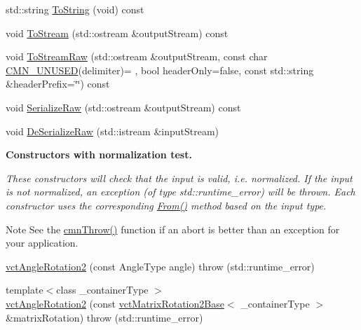 \begin{DoxyCompactItemize}
std\+::string \hyperlink{classvct_angle_rotation2_a8b9dfa85894a2db5a16bca82e84722b3}{To\+String} (void) const 
\item 
void \hyperlink{classvct_angle_rotation2_a413c2f8d65112ff7e8382c605c20a37a}{To\+Stream} (std\+::ostream \&output\+Stream) const 
\item 
void \hyperlink{classvct_angle_rotation2_a4990b0ad346f5186f7ba4bb5342ab9f1}{To\+Stream\+Raw} (std\+::ostream \&output\+Stream, const char \hyperlink{cmn_portability_8h_a021894e2626935fa2305434b1e893ff6}{C\+M\+N\+\_\+\+U\+N\+U\+S\+E\+D}(delimiter)= \textquotesingle{} \textquotesingle{}, bool header\+Only=false, const std\+::string \&header\+Prefix=\char`\"{}\char`\"{}) const 
\item 
void \hyperlink{classvct_angle_rotation2_ad097953f97ed6c015bcc97c7aff99d11}{Serialize\+Raw} (std\+::ostream \&output\+Stream) const 
\item 
void \hyperlink{classvct_angle_rotation2_acf9bfa185dd8d9dd5d68899b904226fa}{De\+Serialize\+Raw} (std\+::istream \&input\+Stream)
\end{DoxyCompactItemize}
\begin{Indent}{\bf Constructors with normalization test.}\par
{\em These constructors will check that the input is valid, i.\+e. normalized. If the input is not normalized, an exception (of type {\ttfamily std\+::runtime\+\_\+error}) will be thrown. Each constructor uses the corresponding \hyperlink{classvct_angle_rotation2_a831a44a42d74add50de6b0cf38c13087}{From()} method based on the input type.

\begin{DoxyNote}{Note}
See the \hyperlink{_minimal_cmn_8h_ad50e82cf9c9dbd0e6443c13e0d1a6f1a}{cmn\+Throw()} function if an {\ttfamily abort} is better than an exception for your application. 
\end{DoxyNote}
}\begin{DoxyCompactItemize}
\item 
\hyperlink{classvct_angle_rotation2_a284d8017b3adff23a4316bffcdad421d}{vct\+Angle\+Rotation2} (const Angle\+Type angle)  throw (std\+::runtime\+\_\+error)
\item 
{\footnotesize template$<$class \+\_\+container\+Type $>$ }\\\hyperlink{classvct_angle_rotation2_a5e703c6c83197f5079d246f4c802ee7b}{vct\+Angle\+Rotation2} (const \hyperlink{classvct_matrix_rotation2_base}{vct\+Matrix\+Rotation2\+Base}$<$ \+\_\+container\+Type $>$ \&matrix\+Rotation)  throw (std\+::runtime\+\_\+error)
\end{DoxyCompactItemize}
\end{Indent}
